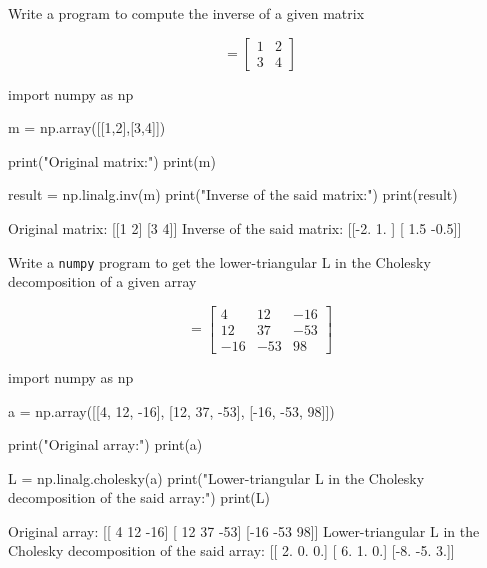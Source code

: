 \cprotEnv\begin{question}
Write a program to compute the inverse of a given matrix

\begin{equation*}
	[M] = \begin{bmatrix}
		1& 2\\
		3& 4
	\end{bmatrix}
\end{equation*}
\end{question}

\cprotEnv\begin{solution}
\begin{ipython}
import numpy as np

m = np.array([[1,2],[3,4]])

print("Original matrix:")
print(m)

result =  np.linalg.inv(m)
print("Inverse of the said matrix:")
print(result)
\end{ipython}
\begin{ioutput}

Original matrix:
[[1 2]
 [3 4]]
Inverse of the said matrix:
[[-2.   1. ]
 [ 1.5 -0.5]]
\end{ioutput}
\end{solution}

\cprotEnv\begin{question}
Write a \texttt{numpy} program to get the lower-triangular L in the Cholesky decomposition of a given array

\begin{equation*}
	[A] = \begin{bmatrix}
		4& 12 & -16\\
		12& 37 & -53\\
		-16& -53 & 98
	\end{bmatrix}
\end{equation*}
\end{question}

\cprotEnv\begin{solution}
\begin{ipython}
import numpy as np

a = np.array([[4, 12, -16], [12, 37, -53], [-16, -53, 98]])

print("Original array:")
print(a)

L = np.linalg.cholesky(a)
print("Lower-triangular L in the Cholesky decomposition of the said array:")
print(L)
\end{ipython}
\begin{ioutput}
Original array:
[[  4  12 -16]
 [ 12  37 -53]
 [-16 -53  98]]
Lower-triangular L in the Cholesky decomposition of the said array:
[[ 2.  0.  0.]
 [ 6.  1.  0.]
 [-8. -5.  3.]]
\end{ioutput}
\end{solution}